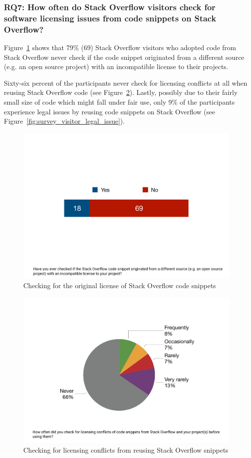 \documentclass{svjour3}                     %
\begin{document}
\subsubsection*{RQ7: How often do Stack Overflow visitors check for software
	licensing issues from code snippets on Stack Overflow?}

Figure~\ref{fig:survey_visitor_original_license} shows that 79\% (69) Stack
Overflow visitors who adopted code from Stack Overflow never check if the code
snippet originated from a different source (e.g. an open source project) with an
incompatible license to their projects.

Sixty-six percent of the participants never check for licensing conflicts at all
when reusing Stack Overflow code (see
Figure~\ref{fig:survey_visitor_licensing_conflict_check}). Lastly, possibly due
to their fairly small size of code which might fall under fair use, only 9\% of
the participants experience legal issues by reusing code snippets on Stack
Overflow (see Figure~\ref{fig:survey_visitor_legal_issue}).

\begin{figure} \centering
	\includegraphics[width=.4\linewidth]{survey_visitor_original_license} 
	\caption{Checking for the original license of Stack Overflow code snippets}
	\label{fig:survey_visitor_original_license} 
\end{figure}

\begin{figure} \centering
	\includegraphics[width=.4\linewidth]{survey_visitor_licensing_conflict_check} 
	\caption{Checking for licensing conflicts from reusing Stack Overflow snippets}
	\label{fig:survey_visitor_licensing_conflict_check} 
\end{figure}
\end{document}
